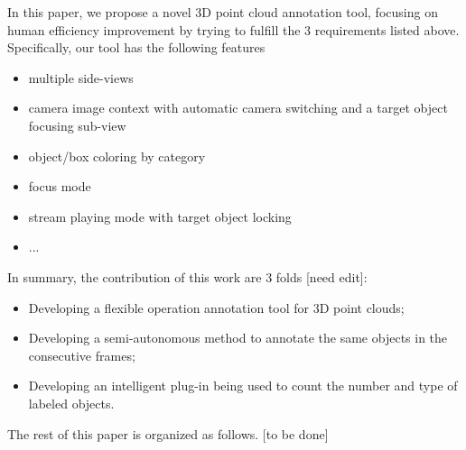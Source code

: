 \documentclass[letterpaper, 10 pt, conference]{ieeeconf}  %
\begin{document}
In this paper, we propose a novel 3D point cloud annotation tool, focusing on human efficiency improvement by trying to fulfill the 3 requirements listed above. Specifically, our tool has the following features
\begin{itemize}
	\item multiple side-views
	\item camera image context with automatic camera switching and a target object focusing sub-view
	\item object/box coloring by category
	\item focus mode
	\item stream playing mode with target object locking
	\item ...
\end{itemize}

In summary, the contribution of this work are 3 folds [need edit]:
\begin{itemize}
	\item Developing a flexible operation annotation tool for 3D point clouds;
	\item Developing a semi-autonomous method to annotate the same objects in the consecutive frames;
	\item Developing an intelligent plug-in being used to count the number and type of labeled objects.
\end{itemize}


The rest of this paper is organized as follows. [to be done]
\end{document}
